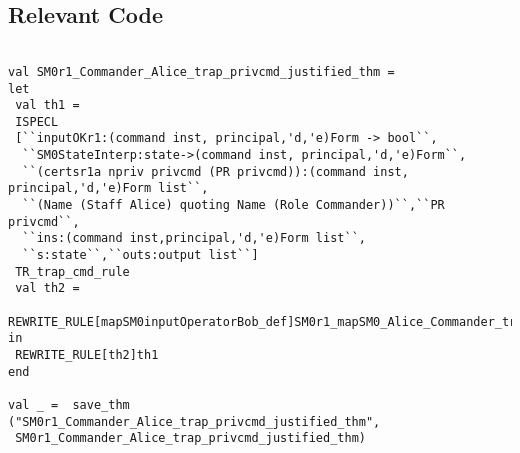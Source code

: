 \documentclass{report}
\begin{document}
\subsection{Relevant Code}
\label{rel-code-4}
\begin{lstlisting}[frame=TBlr]

val SM0r1_Commander_Alice_trap_privcmd_justified_thm =
let
 val th1 =
 ISPECL
 [``inputOKr1:(command inst, principal,'d,'e)Form -> bool``,
  ``SM0StateInterp:state->(command inst, principal,'d,'e)Form``,
  ``(certsr1a npriv privcmd (PR privcmd)):(command inst, principal,'d,'e)Form list``,
  ``(Name (Staff Alice) quoting Name (Role Commander))``,``PR privcmd``,
  ``ins:(command inst,principal,'d,'e)Form list``,
  ``s:state``,``outs:output list``]
 TR_trap_cmd_rule
 val th2 =
 REWRITE_RULE[mapSM0inputOperatorBob_def]SM0r1_mapSM0_Alice_Commander_trap_privcmd_lemma
in 
 REWRITE_RULE[th2]th1
end

val _ =  save_thm  ("SM0r1_Commander_Alice_trap_privcmd_justified_thm",
 SM0r1_Commander_Alice_trap_privcmd_justified_thm)


\end{lstlisting}
\end{document}
